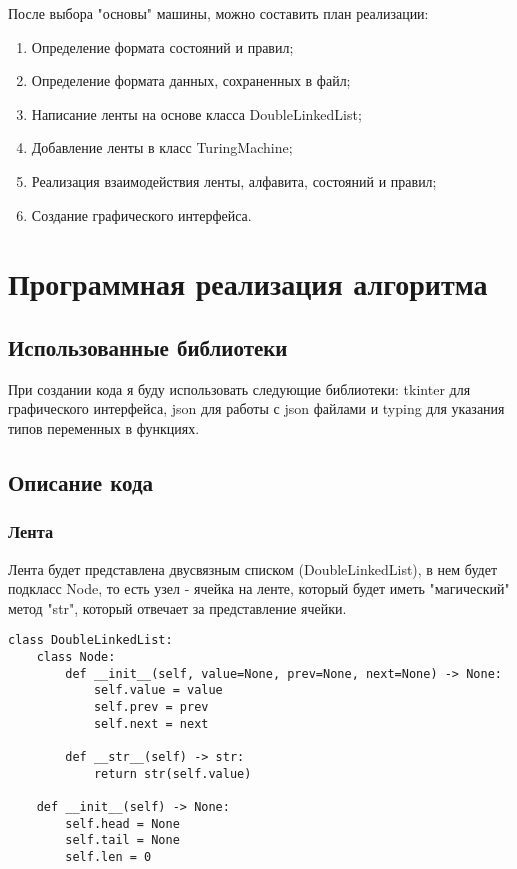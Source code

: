 После выбора "основы" машины, можно составить план реализации:

\begin{enumerate}[label=\arabic*., noitemsep,nolistsep]
    \item Определение формата состояний и правил;
    \item Определение формата данных, сохраненных в файл;
    \item Написание ленты на основе класса DoubleLinkedList;
    \item Добавление ленты в класс TuringMachine;
    \item Реализация взаимодействия ленты, алфавита, состояний и правил;
    \item Создание графического интерфейса.
\end{enumerate}



\section{Программная реализация алгоритма}

\subsection{\textbf{Использованные библиотеки}}
При создании кода я буду использовать следующие библиотеки: tkinter для графического интерфейса, json для работы с json файлами и typing для указания типов переменных в функциях.

\subsection{\textbf{Описание кода}}

\subsubsection{Лента}

Лента будет представлена двусвязным списком (DoubleLinkedList), в нем будет подкласс Node, то есть узел - ячейка на ленте, который будет иметь "магический" метод "str", который отвечает за представление ячейки.

\begin{lstlisting}
class DoubleLinkedList:
    class Node:
        def __init__(self, value=None, prev=None, next=None) -> None:
            self.value = value
            self.prev = prev
            self.next = next

        def __str__(self) -> str:
            return str(self.value)

    def __init__(self) -> None:
        self.head = None
        self.tail = None
        self.len = 0
\end{lstlisting}

